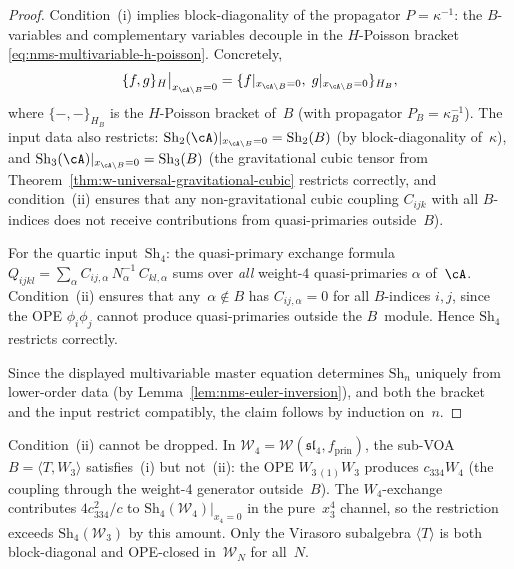 \begin{proof}
Condition~(i) implies block-diagonality of the
propagator $P = \kappa^{-1}$: the $B$-variables and complementary
variables decouple in the $H$-Poisson bracket
\eqref{eq:nms-multivariable-h-poisson}. Concretely,
\[
\{f, g\}_H\big|_{x_{\cA \setminus B} = 0}
=
\{f|_{x_{\cA \setminus B} = 0},\;
 g|_{x_{\cA \setminus B} = 0}\}_{H_B},
\]
where $\{-,-\}_{H_B}$ is the $H$-Poisson bracket of~$B$ (with
propagator $P_B = \kappa_B^{-1}$). The input data also restricts:
$\mathrm{Sh}_2(\cA)|_{x_{\cA \setminus B} = 0} = \mathrm{Sh}_2(B)$
(by block-diagonality of~$\kappa$), and
$\mathrm{Sh}_3(\cA)|_{x_{\cA \setminus B} = 0} = \mathrm{Sh}_3(B)$
(the gravitational cubic tensor
from Theorem~\ref{thm:w-universal-gravitational-cubic} restricts
correctly, and condition~(ii) ensures that any non-gravitational
cubic coupling $C_{ijk}$ with all $B$-indices does not receive
contributions from quasi-primaries outside~$B$).

For the quartic input~$\mathrm{Sh}_4$: the quasi-primary exchange formula
$Q_{ijkl} = \sum_\alpha C_{ij,\alpha}\,N_\alpha^{-1}\,C_{kl,\alpha}$
sums over \emph{all} weight-$4$ quasi-primaries $\alpha$ of~$\cA$.
Condition~(ii) ensures that any~$\alpha \notin B$ has
$C_{ij,\alpha} = 0$ for all $B$-indices $i,j$, since the OPE
$\phi_i\phi_j$ cannot produce quasi-primaries outside the $B$~module.
Hence $\mathrm{Sh}_4$ restricts correctly.

Since the displayed multivariable master equation determines
$\mathrm{Sh}_n$ uniquely from lower-order data (by
Lemma~\ref{lem:nms-euler-inversion}), and both the bracket and the
input restrict compatibly, the claim follows by induction on~$n$.
\end{proof}

\begin{remark}\label{rem:ope-closedness-necessary}
%
Condition~(ii) cannot be dropped.
In $\mathcal{W}_4 = \mathcal{W}(\mathfrak{sl}_4, f_{\mathrm{prin}})$,
the sub-VOA $B = \langle T, W_3\rangle$ satisfies~(i) but not~(ii):
the OPE $W_{3\,(1)}W_3$ produces $c_{334} W_4$ (the coupling
through the weight-$4$ generator outside~$B$).
The $W_4$-exchange contributes $4c_{334}^2/c$ to
$\mathrm{Sh}_4(\mathcal{W}_4)|_{x_4=0}$ in the pure~$x_3^4$ channel,
so the restriction exceeds $\mathrm{Sh}_4(\mathcal{W}_3)$ by this amount.
Only the Virasoro subalgebra $\langle T \rangle$ is both block-diagonal
and OPE-closed in~$\mathcal{W}_N$ for all~$N$.
\end{remark}

